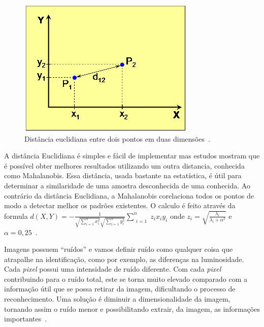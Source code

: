     \begin{figure}[hbt]
		\begin{center}
			\includegraphics[scale=1.0]{figuras/2.FundamentacaoTeorica/graficoDistanciaEntrePontos.png}
		\end{center}
		\caption{Distância euclidiana entre dois pontos em duas dimensões~\cite{hewitt}.}
		\label{distanciaEntrePontos}
	\end{figure}

A distância Euclidiana é simples e fácil de implementar mas estudos mostram que é possível obter melhores resultados utilizando um outra distancia, conhecida como Mahalanobis. Essa distância, usada bastante na estatística, é útil para determinar a similaridade de uma amostra desconhecida de uma conhecida. Ao contrário da distância Euclidiana, a Mahalanobis corelaciona todos os pontos de modo a detectar melhor os padrões existentes. O calculo é feito através da formula $\displaystyle d(X, Y) =  - \frac{1}{\sqrt{\sum_{i=1}^{n} x_i^2} \sqrt{\sum_{i=1}^{n} y_i^2}}   \sum_{\substack{i=1}}^{n} z_ix_iy_i$ onde $\displaystyle z_i = \sqrt{\frac{\lambda_i}{\lambda_i + \alpha^2}}$ e $\displaystyle \alpha = 0,25$~\cite{compareDistances}.

Imagens possuem ``ruídos'' e vamos definir ruído como qualquer coisa que atrapalhe na identificação, como por exemplo, as diferenças na luminosidade. Cada \textit{pixel} possui uma intensidade de ruído diferente. Com cada \textit{pixel} contribuindo para o ruído total, este se torna muito elevado comparado com a informação útil que se possa retirar da imagem, dificultando o processo de reconhecimento. Uma solução é diminuir a dimensionalidade da imagem, tornando assim o ruído menor e possibilitando extrair, da imagem, as informações importantes~\cite{hewitt}.


